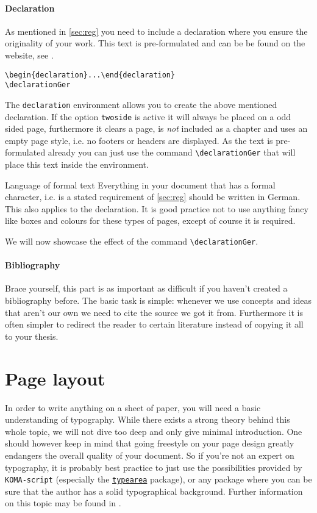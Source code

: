 \paragraph{Declaration}\label{par:decla} As mentioned in \cref{sec:reg} you need to include 
a declaration where you ensure the originality of your work. This text is pre-formulated 
and can be be found on the website, see \cite{FAUreg}.
\begin{emphBox}
\lstinline|\begin{declaration}...\end{declaration}|\\
\lstinline|\declarationGer|
\end{emphBox}
The \lstinline|declaration| environment allows you to create the above mentioned 
declaration. If the option \lstinline|twoside| is active it will always be placed on a odd 
sided page, furthermore it clears a page, is \emph{not} included as a chapter and uses an 
empty page style, i.e. no footers or headers are displayed. 
As the text is pre-formulated already you can just use the command \lstinline|\declarationGer| 
that will place this text inside the environment. 
\begin{memo}{Language of formal text}
Everything in your document that has a formal character, i.e. is a stated requirement of 
\cref{sec:reg} should be written in German. This also applies to the declaration. 
It is good practice not to use anything fancy like boxes and colours for these types of 
pages, except of course it is required. 
\end{memo}
We will now showcase the effect of the command \lstinline|\declarationGer|.
\declarationGer
\paragraph{Bibliography} Brace yourself, this part is as important as difficult if you 
haven't created a bibliography before. The basic task is simple: whenever we use concepts 
and ideas that aren't our own we need to cite the source we got it from. Furthermore it 
is often simpler to redirect the reader to certain literature instead of copying it all 
to your thesis. 
\section{Page layout}\label{sec:pagelay}
In order to write anything on a sheet of paper, you will need a basic understanding 
of typography. While there exists a strong theory behind this whole topic, we will 
not dive too deep and only give minimal introduction. One should however keep in mind that 
going freestyle on your page design greatly endangers the overall quality of your document. 
So if you're not an expert on typography, it is probably best practice to just use the 
possibilities provided by \texttt{KOMA-script} 
(especially the \href{https://ctan.org/pkg/enumitem}{\texttt{typearea}} package), 
or any package where you can be sure that 
the author has a solid typographical background. Further information on this topic may be 
found in \cite{Tschichold75, Willberg99}.
